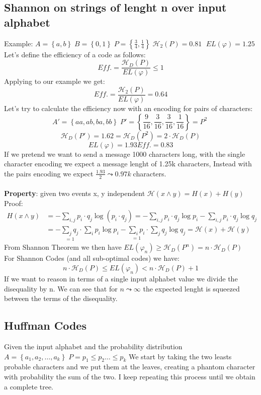     \subsection{Shannon on strings of lenght n over input alphabet}
    Example: $A=\left\{ a,b \right\} \;B=\left\{ 0,1 \right\}\; P=\left\{ \frac{3}{4}, \frac{1}{4} \right\}\; \mathcal{H}_2(P)=0.81\;$ 
    $EL(\varphi) = 1.25$\\
    Let's define the efficiency of a code as follows:
    $$Eff. = \frac{\mathcal{H}_D(P)}{EL(\varphi)}\leq 1$$
    Applying to our example we get: 
    $$Eff. = \frac{\mathcal{H}_2(P)}{EL(\varphi)}=0.64$$
    Let's try to calculate the efficiency now with an encoding for pairs of characters:
    $$A'=\left\{ aa, ab,ba,bb \right\}\; P'=\left\{ \frac{9}{16}, \frac{3}{16}, \frac{3}{16}, \frac{1}{16} \right\} = P^2 \;$$ $$
    \mathcal{H}_D(P')= 1.62 = \mathcal{H}_D(P^2) = 2\cdot \mathcal{H}_D(P)$$
    $$EL(\varphi) = 1.93 Eff. = 0.83$$
    If we pretend we want to send a message 1000 characters long, with the single character encoding we expect a message lenght of 1.25k characters,
    Instead with the pairs encoding we expect $\frac{1.93}{2} \leadsto 0.97k \;$characters.\\\\
    \textbf{Property}: given two events x, y independent
    $\mathcal{H}(x \wedge y) = H(x) + H(y)$
    Proof:
    \begin{align*}
        H(x \wedge y ) &= -\sum_{i,j}^{}{p_i \cdot q_j \log{(p_i\cdot q_j)}} = - \sum_{i,j}^{}{p_i \cdot q_j \log{p_i}} - \sum_{i,j}^{}{p_i\cdot q_j \log{q_j}}\\
        &= -\underset{=1}{\sum_{j}{q_j}} \cdot \sum_{i}^{}{p_i \log{p_i}} - \underset{=1}{\sum_{i}{p_i}} \cdot \sum_{j}{q_j \log{q_j}} = \mathcal{H}(x) + \mathcal{H}(y)
    \end{align*}
    From Shannon Theorem we then have $EL(\varphi_n) \geq \mathcal{H}_D(P^n) = n\cdot \mathcal{H}_D(P)$\\
    For Shannon Codes (and all sub-optimal codes) we have:
    $$ n\cdot \mathcal{H}_D(P) \leq EL(\varphi_n) < n\cdot \mathcal{H}_D(P)+1$$ If we want to reason in terms of a single input alphabet value
    we divide the disequality by n. We can see that for $n \leadsto \infty $ the expected lenght is squeezed between the terms of the disequality.



    \subsection{Huffman Codes}
    Given the input alphabet and the probability distribution
    $A = \left\{ a_1, a_2, \ldots, a_k \right\} \; P={p_1\leq p_2 \ldots \leq p_k}$
    We start by taking the two leasts probable characters and we put them at the leaves, creating a phantom character with probability
    the sum of the two. I keep repeating this process until we obtain a complete tree.

